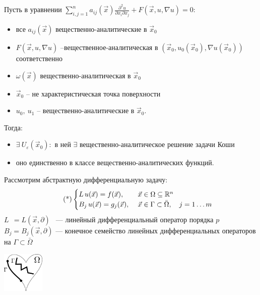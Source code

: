 \documentclass[../main.tex]{subfiles}
\begin{document}
\begin{theorem}[Ковалевской]
Пусть в уравнении $\displaystyle\sum\limits_{i,j=1}^{n} a_{ij}(\vec{x})\frac{\partial^2u}{\partial x_i\partial x_j} + F(\vec{x}, u, \nabla u) = 0$:
\begin{itemize}[nolistsep, noitemsep]
\item все $a_{ij}(\vec{x})$ вещественно-аналитические в $\vec{x}_0$ 
\item $F(\vec{x}, u, \nabla u)$ --вещественное-аналитическая в $(\vec{x}_0, u_0(\vec{x}_0), \nabla u(\vec{x}_0))$ соответственно 
\item $\omega(\vec{x})$ вещественно-аналитическая в $\vec{x}_0$
\item $\vec{x}_0$ -- не характеристическая точка поверхности
\item $u_0,\ u_1$ -- вещественно-аналитические в $\vec{x}_0$.
\end{itemize}
Тогда: 
\begin{itemize}[nolistsep, noitemsep]
\item $\exists\: U_{\varepsilon}(\vec{x}_0)\colon$ в ней $\exists$ вещественно-аналитическое решение задачи Коши
\item оно единственно в классе вещественно-аналитических функций.
\end{itemize}
\end{theorem}


Рассмотрим абстрактную дифференциальную задачу:
\begin{equation}
\label{eq::2::diff}
\tag{*}
\begin{cases} L\, u(\vec{x}) = f(\vec{x}),\ &\vec{x} \in \Omega \subseteq \mathbb{R}^n  \\
B_j\, u(\vec{x}) = g_j(\vec{x}),\ &\vec{x}\in \Gamma \subset \bar{\Omega},\quad j = 1 \ldots m
\end{cases}
\end{equation}
$L\;\, = L(\vec{x}, \partial)\;\,$ --- линейный дифференциальный оператор порядка $p$\\
$B_j = B_j(\vec{x}, \partial)$ --- конечное семейство линейных дифференциальных операторов на $\Gamma \subset \bar{\Omega}$

\begin{center}
\includegraphics[width=0.15\textwidth]{pic 2_3.pdf}
\end{center}
\end{document}
